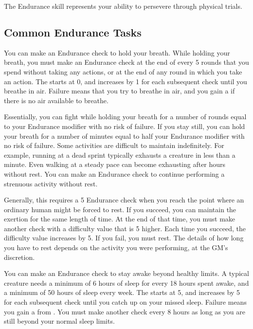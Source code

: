 \newpage
{}
    The Endurance skill represents your ability to persevere through physical trials.

    \subsection{Common Endurance Tasks}
        \label{Hold Breath}
        You can make an Endurance check to hold your breath.
        While holding your breath, you must make an Endurance check at the end of every 5 rounds that you spend without taking any actions, or at the end of any round in which you take an action.
        The  starts at 0, and increases by 1 for each subsequent check until you breathe in air.
        Failure means that you try to breathe in air, and you gain a  if there is no air available to breathe.

        Essentially, you can fight while holding your breath for a number of rounds equal to your Endurance modifier with no risk of failure.
        If you stay still, you can hold your breath for a number of minutes equal to half your Endurance modifier with no risk of failure.
        \label{Maintain Exertion}
        Some activities are difficult to maintain indefinitely.
        For example, running at a dead sprint typically exhausts a creature in less than a minute.
        Even walking at a steady pace can become exhausting after hours without rest.
        You can make an Endurance check to continue performing a strenuous activity without rest.

        Generally, this requires a  5 Endurance check when you reach the point where an ordinary human might be forced to rest.
        If you succeed, you can maintain the exertion for the same length of time.
        At the end of that time, you must make another check with a difficulty value that is 5 higher.
        Each time you succeed, the difficulty value increases by 5.
        If you fail, you must rest.
        The details of how long you have to rest depends on the activity you were performing, at the GM's discretion.

        \label{Stay Awake} You can make an Endurance check to stay awake beyond healthy limits.
        A typical creature needs a minimum of 6 hours of sleep for every 18 hours spent awake, and a minimum of 50 hours of sleep every week.
        The  starts at 5, and increases by 5 for each subsequent check until you catch up on your missed sleep.
        Failure means you gain a  from .
        You must make another check every 8 hours as long as you are still beyond your normal sleep limits.

